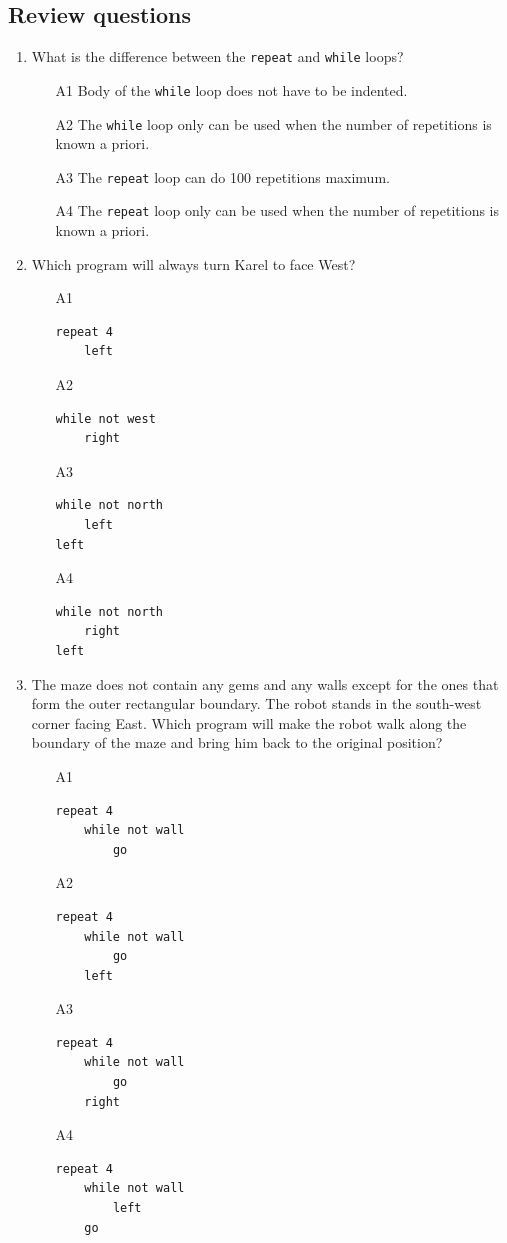 {{{{\subsection{Review questions}

\begin{enumerate}
\item What is the difference between the {\tt repeat} and {\tt while} loops?
\begin{enumerate}
\item[A1] Body of the {\tt while} loop does not have to be indented.
\item[A2] The {\tt while} loop only can be used when the number of repetitions is known a priori.
\item[A3] The {\tt repeat} loop can do 100 repetitions maximum.
\item[A4] The {\tt repeat} loop only can be used when the number of repetitions is known a priori.
\end{enumerate}
\item Which program will always turn Karel to face West?
\begin{enumerate}
\item[A1] 
\begin{verbatim}
repeat 4
    left
\end{verbatim}
\item[A2] 
\begin{verbatim}
while not west
    right
\end{verbatim}
\item[A3] 
\begin{verbatim}
while not north
    left
left
\end{verbatim}
\item[A4] 
\begin{verbatim}
while not north 
    right
left
\end{verbatim}
\end{enumerate}
\item The maze does not contain any gems and any walls except for the ones that 
      form the outer rectangular boundary.
      The robot stands in the south-west corner facing East. Which program will 
      make the robot walk along the 
      boundary of the maze and bring him back to the original position?
\begin{enumerate}
\item[A1] 
\begin{verbatim}
repeat 4
    while not wall
        go
\end{verbatim}
\item[A2] 
\begin{verbatim}
repeat 4
    while not wall
        go
    left
\end{verbatim}
\item[A3] 
\begin{verbatim}
repeat 4
    while not wall
        go
    right
\end{verbatim}
\item[A4] 
\begin{verbatim}
repeat 4
    while not wall
        left
    go
\end{verbatim}
\end{enumerate}
\end{enumerate}

}}}}
